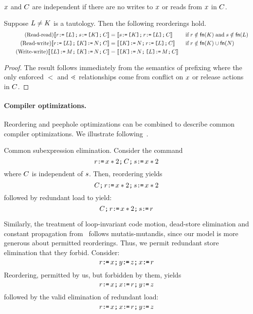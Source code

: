 $x$ and $C$ are independent if there are no writes to $x$ or reads from $x$ in $C$.  
\begin{lemma}%
  Suppose $L\neq K$ is a tautology.  Then the following reorderings hold.
  \begin{align*}
    \tag{Read-read}
    \llbracket r \texttt{:}\mkern-1mu\texttt{=}\, \texttt{[}L\texttt{]} \texttt{;}\, s \texttt{:}\mkern-1mu\texttt{=}\, \texttt{[}K\texttt{]} \texttt{;}\, C\rrbracket &=
    \llbracket s \texttt{:}\mkern-1mu\texttt{=}\, \texttt{[}K\texttt{]} \texttt{;}\, r \texttt{:}\mkern-1mu\texttt{=}\, \texttt{[}L\texttt{]} \texttt{;}\, C\rrbracket
    &&\;\allowbreak\text{if}\allowbreak\; r\notin\mathsf{fn}(K) \;\allowbreak\text{and}\allowbreak\; s\notin\mathsf{fn}(L)
    \\
    \tag{Read-write}
    \llbracket r \texttt{:}\mkern-1mu\texttt{=}\, \texttt{[}L\texttt{]} \texttt{;}\, \texttt{[}K\texttt{]} \texttt{:}\mkern-1mu\texttt{=}\, N \texttt{;}\, C\rrbracket &=
    \llbracket\texttt{[}K\texttt{]} \texttt{:}\mkern-1mu\texttt{=}\, N \texttt{;}\, r \texttt{:}\mkern-1mu\texttt{=}\, \texttt{[}L\texttt{]} \texttt{;}\, C\rrbracket
    &&\;\allowbreak\text{if}\allowbreak\; r\notin\mathsf{fn}(K) \cup\mathsf{fn}(N)
    \\
    \tag{Write-write}
    \llbracket\texttt{[}L\texttt{]} \texttt{:}\mkern-1mu\texttt{=}\, M \texttt{;}\, \texttt{[}K\texttt{]} \texttt{:}\mkern-1mu\texttt{=}\, N \texttt{;}\, C\rrbracket &=
    \llbracket\texttt{[}K\texttt{]} \texttt{:}\mkern-1mu\texttt{=}\, N \texttt{;}\, \texttt{[}L\texttt{]} \texttt{:}\mkern-1mu\texttt{=}\, M \texttt{;}\, C\rrbracket
  \end{align*}
\begin{proof}
  The result follows immediately from the semantics of prefixing where the
  only enforced $\lt$ and $\lessdot$ relationships come from conflict on $x$ or
  release actions in $C$.
\end{proof}
\end{lemma}

\paragraph*{Compiler optimizations.} Reordering and peephole optimizations can be combined to describe common  compiler optimizations.  We illustrate following~\citet{Dolan:2018:BDR:3192366.3192421}.

Common subexpression elimination. Consider the command 
\[ r \texttt{:}\mkern-1mu\texttt{=}\, x *2  \texttt{;}\, C \texttt{;}\, s \texttt{:}\mkern-1mu\texttt{=}\, x * 2 \]
where $C$ is independent of $s$.  Then, reordering yields
\[C \texttt{;}\, r \texttt{:}\mkern-1mu\texttt{=}\, x *2  \texttt{;}\,  s \texttt{:}\mkern-1mu\texttt{=}\, x * 2 \]
followed by redundant load to yield:
\[C \texttt{;}\, r \texttt{:}\mkern-1mu\texttt{=}\, x * 2 \texttt{;}\,  s \texttt{:}\mkern-1mu\texttt{=}\, r\]

Similarly, the treatment of loop-invariant code motion, dead-store elimination and constant propagation from~\citet{Dolan:2018:BDR:3192366.3192421} follows mutatis-mutandis, since our model is more generous about permitted reorderings.  Thus, we permit  redundant store elimination that they forbid.
Consider:
\[ r \texttt{:}\mkern-1mu\texttt{=}\, x \texttt{;}\, y \texttt{:}\mkern-1mu\texttt{=}\, z  \texttt{;}\, x \texttt{:}\mkern-1mu\texttt{=}\, r \]
Reordering, permitted by us, but forbidden by them, yields
\[ r \texttt{:}\mkern-1mu\texttt{=}\, x \texttt{;}\, x \texttt{:}\mkern-1mu\texttt{=}\, r \texttt{;}\, y \texttt{:}\mkern-1mu\texttt{=}\, z  \]
followed by the valid elimination of redundant load:
\[ r \texttt{:}\mkern-1mu\texttt{=}\, x \texttt{;}\, x \texttt{:}\mkern-1mu\texttt{=}\, r \texttt{;}\, y \texttt{:}\mkern-1mu\texttt{=}\, z  \]


